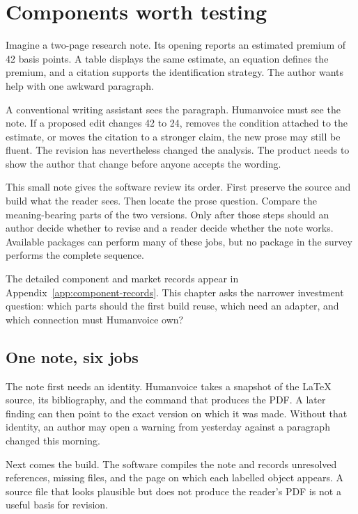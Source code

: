 \chapter{Components worth testing}
\label{ch:software-dossiers}

Imagine a two-page research note. Its opening reports an estimated premium of
42 basis points. A table displays the same estimate, an equation defines the
premium, and a citation supports the identification strategy. The author wants
help with one awkward paragraph.

A conventional writing assistant sees the paragraph. Humanvoice must see the
note. If a proposed edit changes 42 to 24, removes the condition attached to the
estimate, or moves the citation to a stronger claim, the new prose may still be
fluent. The revision has nevertheless changed the analysis. The product needs
to show the author that change before anyone accepts the wording.

This small note gives the software review its order. First preserve the source
and build what the reader sees. Then locate the prose question. Compare the
meaning-bearing parts of the two versions. Only after those steps should an
author decide whether to revise and a reader decide whether the note works.
Available packages can perform many of these jobs, but no package in the survey
performs the complete sequence.

The detailed component and market records appear in
Appendix~\ref{app:component-records}. This chapter asks the narrower investment
question: which parts should the first build reuse, which need an adapter, and
which connection must Humanvoice own?

\section{One note, six jobs}
\label{sec:component-jobs}

The note first needs an identity. Humanvoice takes a snapshot of the LaTeX
source, its bibliography, and the command that produces the PDF. A later
finding can then point to the exact version on which it was made. Without that
identity, an author may open a warning from yesterday against a paragraph
changed this morning.

Next comes the build. The software compiles the note and records unresolved
references, missing files, and the page on which each labelled object appears.
A source file that looks plausible but does not produce the reader's PDF is not
a useful basis for revision.


